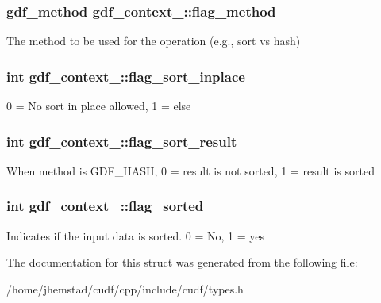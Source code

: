 \subsubsection[{\texorpdfstring{flag\+\_\+method}{flag_method}}]{\setlength{\rightskip}{0pt plus 5cm}gdf\+\_\+method gdf\+\_\+context\+\_\+\+::flag\+\_\+method}\hypertarget{structgdf__context___a835f25957aee3644e44dae95fcee9824}{}\label{structgdf__context___a835f25957aee3644e44dae95fcee9824}
The method to be used for the operation (e.\+g., sort vs hash) 
\subsubsection[{\texorpdfstring{flag\+\_\+sort\+\_\+inplace}{flag_sort_inplace}}]{\setlength{\rightskip}{0pt plus 5cm}int gdf\+\_\+context\+\_\+\+::flag\+\_\+sort\+\_\+inplace}\hypertarget{structgdf__context___ac694627cbc70f39bc249a99876baf8de}{}\label{structgdf__context___ac694627cbc70f39bc249a99876baf8de}
0 = No sort in place allowed, 1 = else 
\subsubsection[{\texorpdfstring{flag\+\_\+sort\+\_\+result}{flag_sort_result}}]{\setlength{\rightskip}{0pt plus 5cm}int gdf\+\_\+context\+\_\+\+::flag\+\_\+sort\+\_\+result}\hypertarget{structgdf__context___a85dc10323c2f955a715d2edad1618835}{}\label{structgdf__context___a85dc10323c2f955a715d2edad1618835}
When method is G\+D\+F\+\_\+\+H\+A\+SH, 0 = result is not sorted, 1 = result is sorted 
\subsubsection[{\texorpdfstring{flag\+\_\+sorted}{flag_sorted}}]{\setlength{\rightskip}{0pt plus 5cm}int gdf\+\_\+context\+\_\+\+::flag\+\_\+sorted}\hypertarget{structgdf__context___afb8cf060524049e9c05a3cfe523528cd}{}\label{structgdf__context___afb8cf060524049e9c05a3cfe523528cd}
Indicates if the input data is sorted. 0 = No, 1 = yes 

The documentation for this struct was generated from the following file\+:\begin{DoxyCompactItemize}
\item 
/home/jhemstad/cudf/cpp/include/cudf/types.\+h\end{DoxyCompactItemize}
